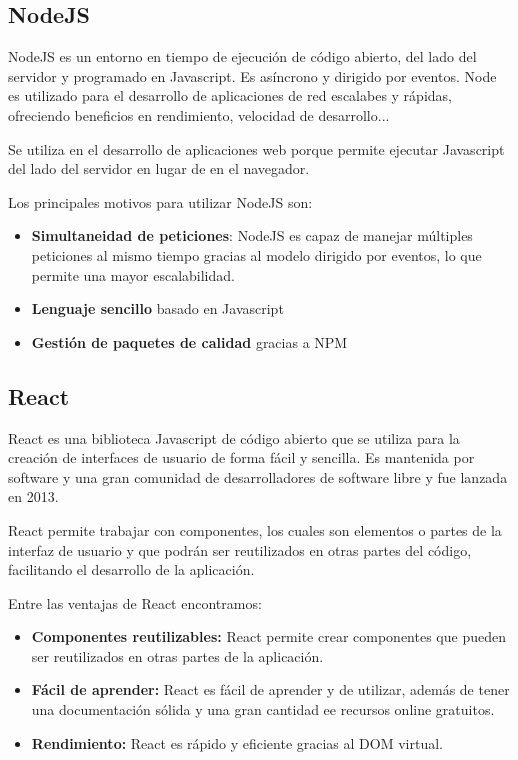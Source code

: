 \subsection{NodeJS}
NodeJS es un entorno en tiempo de ejecución de código abierto, del lado del servidor y programado en Javascript. 
Es asíncrono y dirigido por eventos. Node es utilizado para el desarrollo de aplicaciones de red escalabes y rápidas, ofreciendo beneficios
en rendimiento, velocidad de desarrollo... 

Se utiliza en el desarrollo de aplicaciones web porque permite ejecutar Javascript del lado del servidor en lugar de en el navegador. 

Los principales motivos para utilizar NodeJS son:
\begin{itemize}
    \item \textbf{Simultaneidad de peticiones}: NodeJS es capaz de manejar múltiples peticiones al mismo tiempo gracias al modelo dirigido por eventos, 
    lo que permite una mayor escalabilidad.
    \item \textbf{Lenguaje sencillo} basado en Javascript
    \item \textbf{Gestión de paquetes de calidad} gracias a NPM
\end{itemize}


\subsection{React}
React es una biblioteca Javascript de código abierto que se utiliza para la creación de interfaces de usuario de forma fácil y sencilla.
Es mantenida por software y una gran comunidad de desarrolladores de software libre y fue lanzada en 2013. 

React permite trabajar con componentes, los cuales son elementos o partes de la interfaz de usuario y que podrán ser reutilizados en otras partes del código, 
facilitando el desarrollo de la aplicación. 

Entre las ventajas de React encontramos:
\begin{itemize}
\item \textbf{Componentes reutilizables:} React permite crear componentes que pueden ser reutilizados en otras partes de la aplicación.
\item \textbf{Fácil de aprender:} React es fácil de aprender y de utilizar, además de tener una documentación sólida y una gran cantidad ee recursos online gratuitos.
\item \textbf{Rendimiento:} React es rápido y eficiente gracias al DOM virtual.
\end{itemize}

